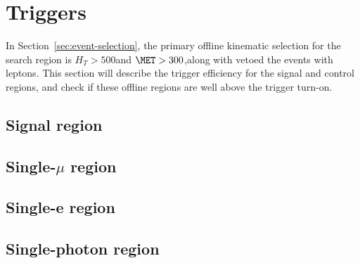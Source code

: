 \def \triggerPlotsDir {plots/triggers/}
\section{Triggers}
\label{sec:trigger}
In Section~\ref{sec:event-selection}, the primary offline kinematic selection for the search region is $H_{T}>500$\gev and $\met>300$\gev,along with vetoed the events with leptons. This section will describe the trigger efficiency for the signal and control regions, and check if these offline regions are well above the trigger turn-on.

\subsection{Signal region}
\label{sec:signalTriggers}


\subsection{Single-$\mu$ region}
\label{sec:SingleMuTrig}

\subsection{Single-e region}


\subsection{Single-photon region}
\label{sec:photonTrg}
  

